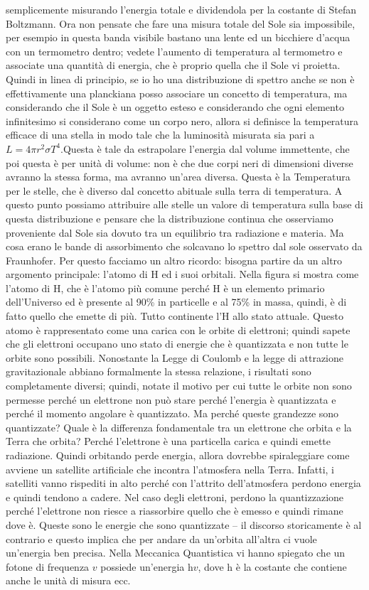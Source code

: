 \documentclass[a4paper,11pt]{article}
\begin{document}
semplicemente misurando l’energia totale e dividendola per la costante di Stefan Boltzmann.
\newline
Ora non pensate che fare una misura totale del Sole sia impossibile, per esempio in questa banda visibile bastano una lente ed un bicchiere d’acqua con un termometro dentro; vedete l’aumento di temperatura al termometro e associate una quantità di energia, che è proprio quella che il Sole vi proietta. Quindi in linea di principio, se io ho una distribuzione di spettro anche se non è effettivamente una planckiana posso associare un concetto di temperatura, ma considerando che il Sole è un oggetto esteso e considerando che ogni elemento infinitesimo si considerano come un corpo nero, allora si definisce la temperatura efficace di una stella in modo tale che la luminosità misurata sia pari a $L=4\pi r^2 \sigma T^4$.Questa è tale da estrapolare l’energia dal volume immettente, che poi questa è per unità di volume: non è che due corpi neri di dimensioni diverse avranno la stessa forma, ma avranno un’area diversa. 
Questa è la Temperatura per le stelle, che è diverso dal concetto abituale sulla terra di temperatura. A questo punto possiamo attribuire alle stelle un valore di temperatura sulla base di questa distribuzione e pensare che la distribuzione continua che osserviamo proveniente dal Sole sia dovuto tra un equilibrio tra radiazione e materia. Ma cosa erano le bande di assorbimento che solcavano lo spettro dal sole osservato da Fraunhofer. 
\newline
Per questo facciamo un altro ricordo: bisogna partire da un altro argomento principale: l’atomo di H ed i suoi orbitali. Nella figura si mostra come l’atomo di H, che è l’atomo più comune perché H è un elemento primario dell’Universo ed è presente al 90\% in particelle e al 75\% in massa, quindi, è di fatto quello che emette di più. Tutto continente l’H allo stato attuale. Questo atomo è rappresentato come una carica con le orbite di elettroni; quindi sapete che gli elettroni occupano uno stato di energie che è quantizzata e non tutte le orbite sono possibili. Nonostante la Legge di Coulomb e la legge di attrazione gravitazionale abbiano formalmente la stessa relazione, i risultati sono completamente diversi; quindi, notate il motivo per cui tutte le orbite non sono permesse perché un elettrone non può stare perché l’energia è quantizzata e perché il momento angolare è quantizzato. Ma perché queste grandezze sono quantizzate? Quale è la differenza fondamentale tra un elettrone che orbita e la Terra che orbita? Perché l’elettrone è una particella carica e quindi emette radiazione. Quindi orbitando perde energia, allora dovrebbe spiraleggiare come avviene un satellite artificiale che incontra l’atmosfera nella Terra. Infatti, i satelliti vanno rispediti in alto perché con l’attrito dell’atmosfera perdono energia e quindi tendono a cadere. Nel caso degli elettroni, perdono la quantizzazione perché l’elettrone non riesce a riassorbire quello che è emesso e quindi rimane dove è. Queste sono le energie che sono quantizzate – il discorso storicamente è al contrario e questo implica che per andare da un’orbita all’altra ci vuole un’energia ben precisa. Nella Meccanica Quantistica vi hanno spiegato che un fotone di frequenza $v$ possiede un’energia h$v$, dove h è la costante che contiene anche le unità di misura ecc. 
\end{document}
